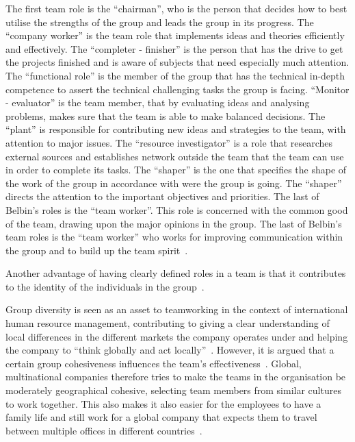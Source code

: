 \documentclass[a4paper,12pt,titlepage]{article}
\begin{document}
  The first team role is the ``chairman'', who is
  the person that decides how to best utilise the strengths of the group
  and leads the group in its progress. The ``company worker'' is the team
  role that implements ideas and theories efficiently and effectively.
  The ``completer - finisher'' is the person that has the drive to get the
  projects finished and is aware of subjects that need especially much
  attention. The ``functional role'' is the member of the group that
  has the technical in-depth competence to assert the technical
  challenging tasks the group is facing. ``Monitor - evaluator'' is the
  team member, that by evaluating ideas and analysing problems,
  makes sure that the team is able to make balanced decisions. The ``plant''
  is responsible for contributing new ideas and strategies to the team,
  with attention to major issues. The ``resource investigator'' is a role
  that researches external sources and establishes network outside the team
  that the team can use in order to complete its tasks. The ``shaper'' is the
  one that specifies the shape of the work of the group in accordance with
  were the group is going. The ``shaper'' directs the attention to the important
  objectives and priorities. The last of Belbin's roles is the ``team worker''.
  This role is concerned with the common good of the team, drawing upon the
  major opinions in the group. The last of Belbin's team roles is
  the ``team worker'' who works for improving
  communication within the group and to build up the team spirit~\cite{rmb}.
  
  Another advantage of having clearly defined roles in a team is that
  it contributes to the identity of the individuals in the
  group~\cite[72]{rb}.

  Group diversity is seen as an asset to teamworking
  in the context of international human resource management, contributing
  to giving a clear understanding of local differences in the different
  markets the company operates under and helping the company to
  ``think globally and act locally''~\cite[7-8]{mmgo}. However, it is
  argued that a certain group cohesiveness influences the team's
  effectiveness~\cite[275]{sr}. Global, multinational companies therefore
  tries to make the teams in the organisation be moderately geographical
  cohesive, selecting team members from similar cultures to work
  together. This also makes it also easier for the employees
  to have a family life and still work for a global company
  that expects them to travel between multiple offices in different
  countries~\cite[18-36]{mmgo}.
\end{document}
